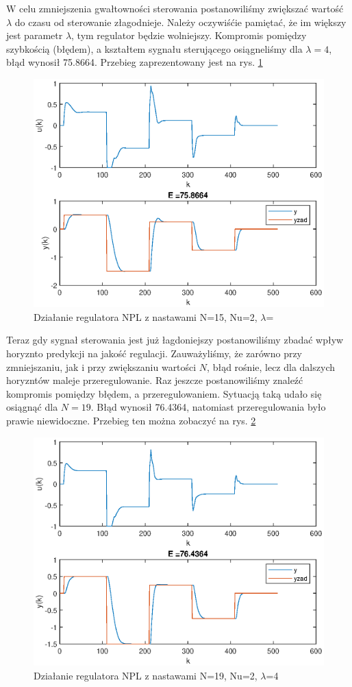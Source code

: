 		W celu zmniejszenia gwałtowności sterowania postanowiliśmy zwiększać wartość $\lambda$ do czasu od sterowanie złagodnieje. Należy oczywiśćie pamiętać, że im większy jest parametr $\lambda$, tym regulator będzie wolniejszy. Kompromis pomiędzy szybkością (błędem), a kształtem sygnału sterującego osiągneliśmy dla $\lambda=4$, błąd wynosił 75.8664. Przebieg zaprezentowany jest na rys. \ref{fig:NPL1}
		
		\begin{figure}[h!]
			\centering
			\includegraphics[width=0.7\linewidth]{img/strojenieNPL_N_15_Nu_2_lam_4.eps}
			\caption{Działanie regulatora NPL z nastawami N=15, Nu=2, $\lambda$=}
			\label{fig:NPL1}
		\end{figure}
		
		\newpage
		Teraz gdy sygnał sterowania jest już łagdoniejszy postanowiliśmy zbadać wpływ horyznto predykcji na jakość regulacji. Zauważyliśmy, że zarówno przy zmniejszaniu, jak i przy zwiększaniu wartości $N$, błąd rośnie, lecz dla dalszych horyzntów maleje przeregulowanie. Raz jeszcze postanowiliśmy znaleźć kompromis pomiędzy błędem, a przeregulowaniem. Sytuacją taką udało się osiągnąć dla $N=19$. Błąd wynosił 76.4364, natomiast przeregulowania było prawie niewidoczne.
		Przebieg ten można zobaczyć na rys. \ref{fig:NPL2}
		
		\begin{figure}[h!]
			\centering
			\includegraphics[width=0.7\linewidth]{img/strojenieNPL_N_19_Nu_2_lam_4.eps}
			\caption{Działanie regulatora NPL z nastawami N=19, Nu=2, $\lambda$=4}
			\label{fig:NPL2}
		\end{figure}
	

